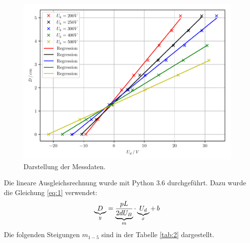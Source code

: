 \begin{figure}[H]
  \centering
  \includegraphics{plot1.pdf}
  \caption{Darstellung der Messdaten.}
  \label{abb:6}
\end{figure}
Die lineare Ausgleichsrechnung wurde mit Python 3.6 durchgeführt.
Dazu wurde die Gleichung \ref{eq:1} verwendet:
\begin{equation*}
  \underbrace{D}_{\mathclap{y}} = \underbrace{\frac{pL}{2dU_B}}_{\mathclap{m}} \cdot \underbrace{U_d}_{\mathclap{x}} + \, b
\end{equation*}
Die folgenden Steigungen $m_{1-5}$ sind in der Tabelle \ref{tab:2} dargestellt.

